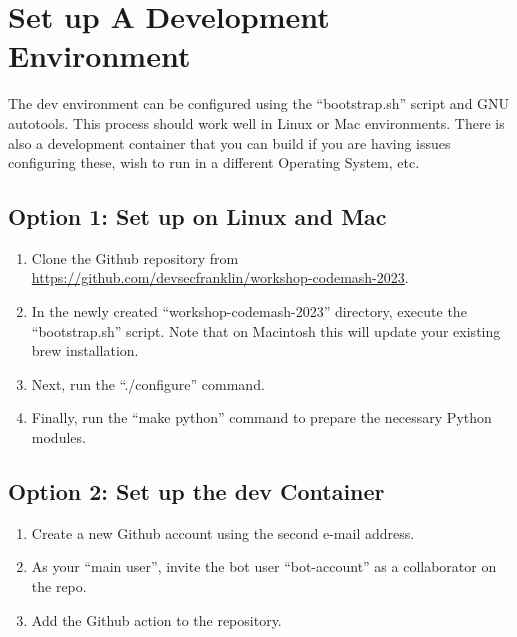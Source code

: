 \section{\label{sec:dev-env}Set up A Development Environment}

\justifying
The dev environment can be configured using the ``bootstrap.sh'' script and GNU autotools. This process should work
well in Linux or Mac environments. There is also a development container that you can build if you are having
issues configuring these, wish to run in a different Operating System, etc.

\subsection{\label{sec:dev-linux}Option 1: Set up on Linux and Mac}

\justifying
\begin{raggedright}
    \begin{enumerate}
        \item Clone the Github repository from \href{https://github.com/devsecfranklin/workshop-codemash-2023}{https://github.com/devsecfranklin/workshop-codemash-2023}.
        \item In the newly created ``workshop-codemash-2023'' directory, execute the ``bootstrap.sh'' script. Note that on Macintosh this will update your existing brew installation.
        \item Next, run the ``./configure'' command.
        \item Finally, run the ``make python'' command to prepare the necessary Python modules.
    \end{enumerate}
\end{raggedright}
\vspace{2mm}

\subsection{\label{sec:dev-container}Option 2: Set up the dev Container}

\justifying
\begin{raggedright}
    \begin{enumerate}
        \item Create a new Github account using the second e-mail address.
        \item As your ``main user'', invite the bot user ``bot-account'' as a collaborator on the repo.
        \item Add the Github action to the repository.
    \end{enumerate}
\end{raggedright}
\vspace{2mm}

